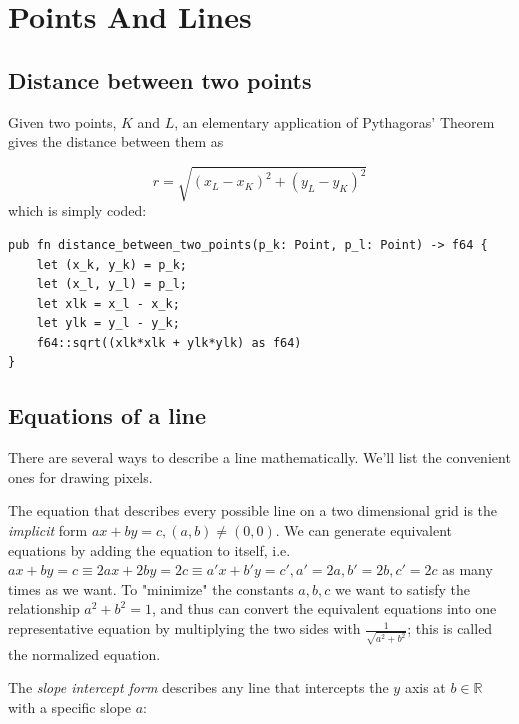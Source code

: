 \documentclass[12pt,openany,a4,usenames,dvipsnames]{book}
\newcommand\pixels{{\pixelfont{}pixels}}
\begin{document}
\part{Points And Lines}
\chapter{Distance between two points}

\begin{figure}[H]
\centering

\end{figure}

Given two points, $K$ and $L$, an elementary application of Pythagoras' Theorem gives the distance between them as

\begin{equation}
  r = \sqrt{(x_{L} - x_{K})^{2} +(y_{L} - y_{K})^{2}}
\end{equation}
which is simply coded:
\begin{verbatim}
pub fn distance_between_two_points(p_k: Point, p_l: Point) -> f64 {
    let (x_k, y_k) = p_k;
    let (x_l, y_l) = p_l;
    let xlk = x_l - x_k;
    let ylk = y_l - y_k;
    f64::sqrt((xlk*xlk + ylk*ylk) as f64)
}
\end{verbatim}
\chapter{Equations of a line}\label{ch:equations-lines}
There are several ways to describe a line mathematically. We'll list the convenient ones for drawing \pixels{}.

The equation that describes every possible line on a two dimensional grid is the \emph{implicit} form $ax+by=c, (a,b) \neq{} (0,0)$. We can generate equivalent equations by adding the equation to itself, i.e. $ax+by=c \equiv 2ax+2by=2c \equiv a'x+b'y=c', a'=2a, b'=2b, c'=2c$ as many times as we want. To "minimize" the constants $a,b,c$ we want to satisfy the relationship $a^{2}+b^{2}=1$, and thus can convert the equivalent equations into one representative equation by multiplying the two sides with $\frac{1}{\sqrt{a^2+b^2}}$; this is called the normalized equation. %

The \emph{slope intercept form} describes any line that intercepts the $y$ axis at $b \in{} \mathbb{R}$ with a specific slope $a$:
\end{document}
